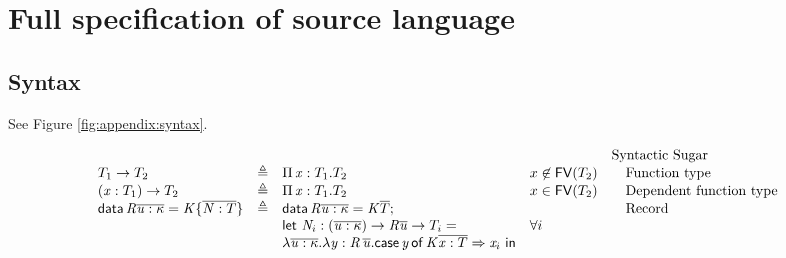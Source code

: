 \newcommand{\FV}{\mathsf{FV}}
\newcommand{\dom}{\mathsf{dom}}

\section{Full specification of source language}
\subsection{Syntax}
See Figure \ref{fig:appendix:syntax}.
\begin{figure*}[ht]
\centering
\gram{\ottpgm\ottinterrule
\ottdecl\ottinterrule
\ottu\ottinterrule
\ottp\ottinterrule
\ottE\ottinterrule
\ottGs}
    \[
    \begin{array}{lllll}
     &&&& \text{Syntactic Sugar} \\
     T_{{\mathrm{1}}}  \rightarrow  T_{{\mathrm{2}}} & \triangleq & \Pi \, \ottmv{x}  \ottsym{:}  T_{{\mathrm{1}}}  \ottsym{.}  T_{{\mathrm{2}}} & x \not \in \FV(T_{{\mathrm{2}}}) & \quad\text{Function type} \\
     \ottsym{(}  \ottmv{x}  \ottsym{:}  T_{{\mathrm{1}}}  \ottsym{)}  \rightarrow  T_{{\mathrm{2}}} & \triangleq & \Pi \, \ottmv{x}  \ottsym{:}  T_{{\mathrm{1}}}  \ottsym{.}  T_{{\mathrm{2}}} & x \in \FV(T_{{\mathrm{2}}}) & \quad\text{Dependent function type} \\
     \kw{data} \, \ottmv{R}  \overline{  \ottnt{u}  \ottsym{:}  \kappa  }  \ottsym{=}  \ottmv{K}  \ottsym{\{}  \overline{  \ottmv{N}  \ottsym{:}  T  }  \ottsym{\}} & \triangleq &
                    \kw{data} \, \ottmv{R}  \overline{  \ottnt{u}  \ottsym{:}  \kappa  }  \ottsym{=}  \ottmv{K}  \overline{  T  }; && \quad\text{Record} \\
                  &&  \kw{let} ~\ottmv{N}_i : \ottsym{(}  \overline{  \ottnt{u}  \ottsym{:}  \kappa  }  \ottsym{)}  \rightarrow  \ottmv{R}    \overline{  \ottnt{u}  }  \rightarrow  T_i = & \forall i &  \\
                  && \lambda  \overline{  \ottnt{u}  \ottsym{:}  \kappa  }  \ottsym{.}  \lambda  \ottmv{y}  \ottsym{:}  \ottmv{R} \, \overline{  \ottnt{u}  }  \ottsym{.}  \kw{case} \, \ottmv{y} \, \kw{of} \, \ottmv{K}  \overline{  \ottmv{x}  \ottsym{:}  T  }  \Rightarrow  \ottmv{x}_i~ \kw{in}  && \\
    \end{array}
    \]
\caption{Syntax of source language}
\label{fig:appendix:syntax}
\end{figure*}

